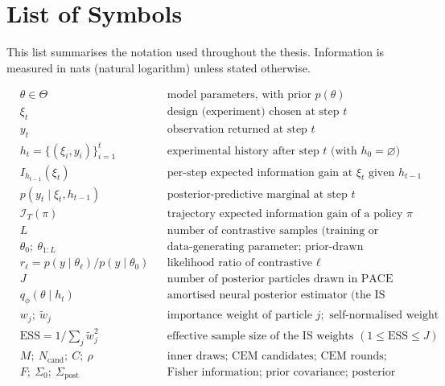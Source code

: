\chapter{List of Symbols}
        This list summarises the notation used throughout the thesis. Information is
        measured in nats (natural logarithm) unless stated otherwise.

        \begin{align*}
                &\theta \in \Theta && \text{model parameters, with prior } p(\theta) \\
                &\xi_t && \text{design (experiment) chosen at step } t \\
                &y_t && \text{observation returned at step } t \\
                &h_t = \{(\xi_i,y_i)\}_{i=1}^{t} && \text{experimental history after step } t \text{ (with } h_0=\varnothing) \\
                &I_{h_{t-1}}(\xi_t) && \text{per-step expected information gain at } \xi_t \text{ given } h_{t-1} \\
                &p(y_t\mid\xi_t,h_{t-1}) && \text{posterior-predictive marginal at step } t \\
                &\mathcal{I}_T(\pi) && \text{trajectory expected information gain of a policy } \pi \\
                &L && \text{number of contrastive samples (training or evaluation)} \\
                &\theta_0;\ \theta_{1:L} && \text{data-generating parameter; prior-drawn contrastives} \\
                &r_\ell = p(y\mid\theta_\ell)/p(y\mid\theta_0) && \text{likelihood ratio of contrastive } \ell \\
                &J && \text{number of posterior particles drawn in PACE} \\
                &q_\phi(\theta\mid h_t) && \text{amortised neural posterior estimator (the IS proposal)} \\
                &w_j;\ \tilde w_j && \text{importance weight of particle } j; \text{ self-normalised weight} \\
                &\mathrm{ESS} = 1/\textstyle\sum_j \tilde w_j^2 && \text{effective sample size of the IS weights } (1\le\mathrm{ESS}\le J) \\
                &M;\ N_{\mathrm{cand}};\ C;\ \rho && \text{inner draws; CEM candidates; CEM rounds; elite fraction} \\
                &F;\ \Sigma_0;\ \Sigma_{\mathrm{post}} && \text{Fisher information; prior covariance; posterior covariance} \\

\end{align*}
